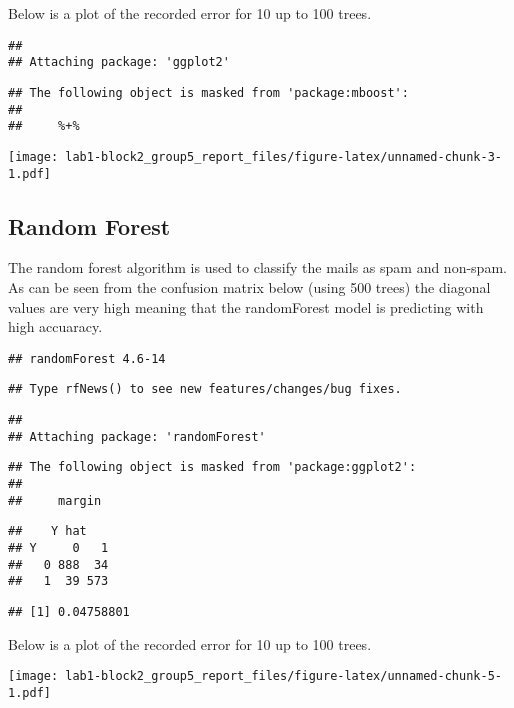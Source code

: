 \documentclass[]{article}
\begin{document}
Below is a plot of the recorded error for 10 up to 100 trees.

\begin{verbatim}
## 
## Attaching package: 'ggplot2'
\end{verbatim}

\begin{verbatim}
## The following object is masked from 'package:mboost':
## 
##     %+%
\end{verbatim}

\texttt{[image: lab1-block2\_group5\_report\_files/figure-latex/unnamed-chunk-3-1.pdf]}

\hypertarget{random-forest}{%
\subsection{Random Forest}\label{random-forest}}

The random forest algorithm is used to classify the mails as spam and
non-spam. As can be seen from the confusion matrix below (using 500
trees) the diagonal values are very high meaning that the randomForest
model is predicting with high accuaracy.

\begin{verbatim}
## randomForest 4.6-14
\end{verbatim}

\begin{verbatim}
## Type rfNews() to see new features/changes/bug fixes.
\end{verbatim}

\begin{verbatim}
## 
## Attaching package: 'randomForest'
\end{verbatim}

\begin{verbatim}
## The following object is masked from 'package:ggplot2':
## 
##     margin
\end{verbatim}

\begin{verbatim}
##    Y hat
## Y     0   1
##   0 888  34
##   1  39 573
\end{verbatim}

\begin{verbatim}
## [1] 0.04758801
\end{verbatim}

Below is a plot of the recorded error for 10 up to 100 trees.

\texttt{[image: lab1-block2\_group5\_report\_files/figure-latex/unnamed-chunk-5-1.pdf]}
\end{document}
